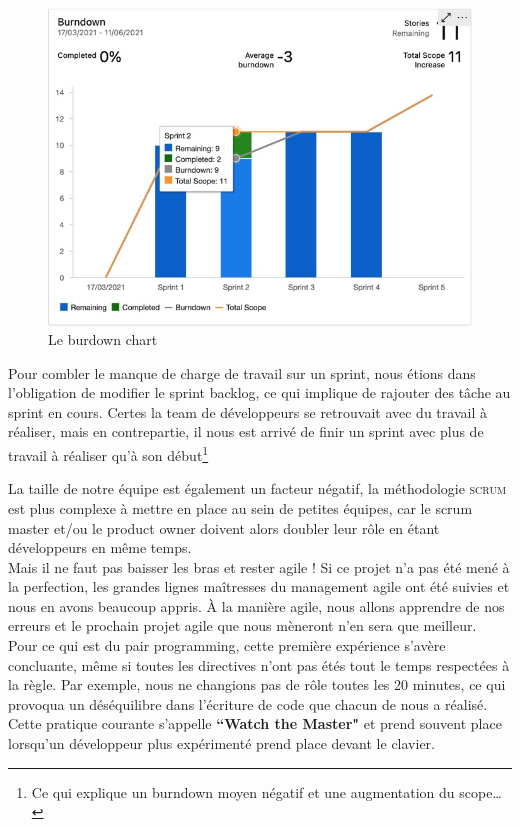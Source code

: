 \begin{figure}[!h]
    \centering
    \includegraphics[scale=0.5]{img/burndown.jpeg}
    \caption{Le burdown chart}
    \label{fig:burndownChart}
\end{figure}

Pour combler le manque de charge de travail sur un sprint, nous étions dans l'obligation de modifier le sprint backlog, ce qui implique de rajouter des tâche au sprint en cours. Certes la team de développeurs se retrouvait avec du travail à réaliser, mais en contrepartie, il nous est arrivé de finir un sprint avec plus de travail à réaliser qu'à son début\footnote{Ce qui explique un burndown moyen négatif et une augmentation du scope\dots }

La taille de notre équipe est également un facteur négatif, la méthodologie \textsc{scrum} est plus complexe à mettre en place au sein de petites équipes, car le scrum master et/ou le product owner doivent alors doubler leur rôle en étant développeurs en même temps.\\

Mais il ne faut pas baisser les bras et rester agile ! Si ce projet n'a pas été mené à la perfection, les grandes lignes maîtresses du management agile ont été suivies et nous en avons beaucoup appris. À la manière agile, nous allons apprendre de nos erreurs et le prochain projet agile que nous mèneront n'en sera que meilleur.\\

Pour ce qui est du pair programming, cette première expérience s'avère concluante, même si toutes les directives n'ont pas étés tout le temps respectées à la règle. Par exemple, nous ne changions pas de rôle toutes les 20 minutes, ce qui provoqua un déséquilibre dans l'écriture de code que chacun de nous a réalisé. Cette pratique courante s'appelle \textbf{“Watch the Master"}\cite{enwiki:1023152145} et prend souvent place lorsqu'un développeur plus expérimenté prend place devant le clavier.


